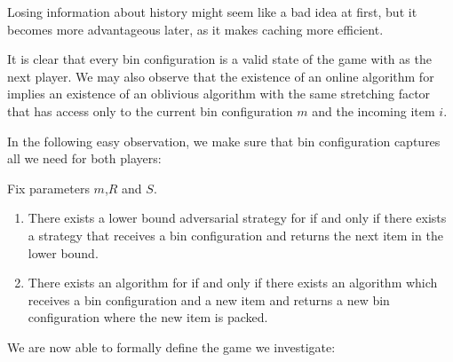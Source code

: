 Losing information about history might seem like a bad idea at first,
but it becomes more advantageous later, as it makes caching more
efficient.

It is clear that every bin configuration is a valid state of the game
with \adversary as the next player. We may also observe that the
existence of an online algorithm for \binstretch implies an existence
of an oblivious algorithm with the same stretching factor that has
access only to the current bin configuration $m$ and the incoming item
$i$.

In the following easy observation, we make sure that bin configuration
captures all we need for both players:

\begin{obs} Fix parameters $m$,$R$ and $S$.
\begin{enumerate}
\item There exists a lower bound adversarial strategy for \binstretch if and only if there exists a strategy
that receives a bin configuration and returns the next item in the lower bound.
\item There exists an algorithm for \binstretch if and only if there exists an algorithm which receives
a bin configuration and a new item and returns a new bin configuration where the new item is packed.
\end{enumerate}
\end{obs}

We are now able to formally define the game we investigate:

